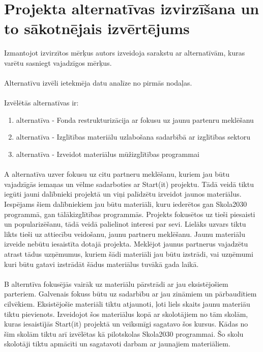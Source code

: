 \section{Projekta alternatīvas izvirzīšana un to sākotnējais izvērtējums}
Izmantojot izvirzītos mērķus autors izveidoja sarakstu ar alternatīvām, kuras varētu sasniegt vajadzīgos
mērķus.
\paragraph{}
Alternatīvu izvēli ietekmēja datu analīze no pirmās nodaļas.
\paragraph{}
Izvēlētās alternatīvas ir:
\renewcommand{\labelenumi}{\Alph{enumi}}
\begin{enumerate}
    \item alternatīva - Fonda restrukturizācija ar fokusu uz jaunu partenru meklēšanu
    \item alternatīva - Izglītības materiālu uzlabošana sadarbībā ar izglītības sektoru
    \item alternatīva - Izveidot materiālus mūžizglītības programmai
\end{enumerate}
\paragraph{}
A alternatīva uzver fokusu uz citu partneru meklēšanu, kuriem jau būtu vajadzīgās iemaņas un vēlme
sadarboties ar Start(it) projektu. Tādā veidā tiktu iegūti jauni dalībnieki projektā un viņi palīdzētu
izveidot jaunos materiālus. Iespējams šiem dalībniekiem jau būtu materiāli, kuru iederētos gan Skola2030
programmā, gan tālākizglītības programmās. Projekts fokusētos uz tieši piesaisti un popularizēšanu,
tādā veidā palielinot interesi par sevi. Lielāks uzvars tiktu likts tieši uz attiecību veidošanu, jaunu
partneru meklēšanu. Jaunu materiālu izveide nebūtu iesaistīta dotajā projekta. Meklējot jaunus partnerus
vajadzētu atrast tādus uzņēmumus, kuriem šādi materiāli jau būtu izstrādi, vai uzņēmumi kuri būtu gatavi
izstrādāt šādus materiālus tuvākā gada laikā.
\paragraph{}
B alterntīva fokusējās vairāk uz materiālu pārstrādi ar jau eksistējošiem parteriem. Galvenais fokuss būtu
uz sadarbību ar jau zināmiem un pārbaudītiem cilvēkiem. Eksistējošie materiāli tiktu atjaunoti, ļoti liels
skaits jaunu materiāu tiktu pievienots. Izveidojot šos materiālus kopā ar skolotājiem no tām skolām, kuras
iesaistījās Start(it) projektā un veiksmīgi sagatavo šos kursus. Kādas no šim skolām tiktu arī izvēlētas kā 
pilotskolas Skola2030 programmai. Šo skolu skolotāji tiktu apmācīti un sagatavoti darbam ar jaunajiem materiāliem.
